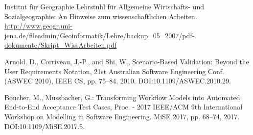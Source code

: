 \documentclass[a4paper,10pt, bibliography=totocnumbered]{scrreprt}
\begin{document}
\begin{thebibliography}{9}
 Institut für Geographie   
Lehrstuhl für Allgemeine Wirtschafts- und Sozialgeographie: An Hinweise zum wissenschaftlichen Arbeiten.
\url{http://www.geogr.uni-jena.de/fileadmin/Geoinformatik/Lehre/backup_05_2007/pdf-dokumente/Skript_WissArbeiten.pdf}

 Arnold, D., Corriveau, J.-P., and Shi, W., Scenario-Based Validation: Beyond the User Requirements Notation, 21st Australian Software Engineering Conf. (ASWEC 2010), IEEE CS, pp. 75–84, 2010. DOI:10.1109/ASWEC.2010.29.

 Boucher, M., Mussbacher, G.: Transforming Workflow Models into Automated End-to-End Acceptance Test Cases, Proc. - 2017 IEEE/ACM 9th International Workshop on Modelling in Software Engineering. MiSE 2017, pp. 68–74, 2017. DOI:10.1109/MiSE.2017.5.






\end{thebibliography}

\listoffigures

\listoftables
\end{document}
